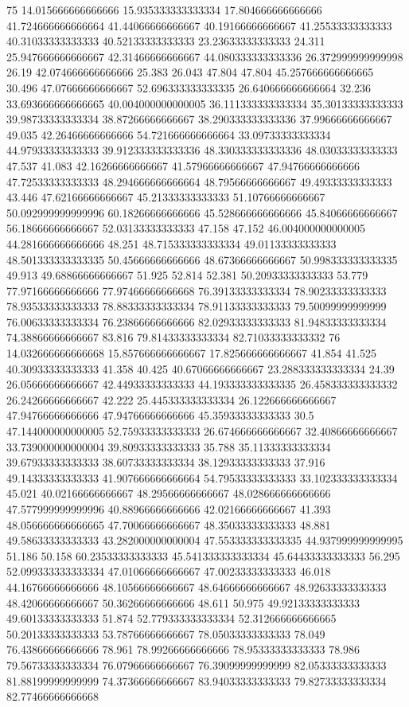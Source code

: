75 14.015666666666666 15.935333333333334 17.804666666666666 41.724666666666664 41.44066666666667 40.19166666666667 41.25533333333333 40.31033333333333 40.52133333333333 23.23633333333333 24.311 25.947666666666667 42.31466666666667 44.080333333333336 26.372999999999998 26.19 42.074666666666666 25.383 26.043 47.804 47.804 45.257666666666665 30.496 47.07666666666667 52.696333333333335 26.640666666666664 32.236 33.693666666666665 40.004000000000005 36.111333333333334 35.30133333333333 39.98733333333334 38.87266666666667 38.290333333333336 37.99666666666667 49.035 42.26466666666666 54.721666666666664 33.09733333333334 44.97933333333333 39.912333333333336 48.330333333333336 48.03033333333333 47.537 41.083 42.16266666666667 41.57966666666667 47.94766666666666 47.72533333333333 48.294666666666664 48.79566666666667 49.49333333333333 43.446 47.62166666666667 45.21333333333333 51.10766666666667 50.092999999999996 60.18266666666666 45.528666666666666 45.84066666666667 56.18666666666667 52.03133333333333 47.158 47.152 46.004000000000005 44.281666666666666 48.251 48.715333333333334 49.01133333333333 48.501333333333335 50.45666666666666 48.67366666666667 50.998333333333335 49.913 49.68866666666667 51.925 52.814 52.381 50.20933333333333 53.779 77.97166666666666 77.97466666666668 76.39133333333334 78.90233333333333 78.93533333333333 78.88333333333334 78.91133333333333 79.50099999999999 76.00633333333334 76.23866666666666 82.02933333333333 81.94833333333334 74.38866666666667 83.816 79.81433333333334 82.71033333333332
76 14.032666666666668 15.857666666666667 17.825666666666667 41.854 41.525 40.30933333333333 41.358 40.425 40.67066666666667 23.288333333333334 24.39 26.05666666666667 42.44933333333333 44.193333333333335 26.458333333333332 26.24266666666667 42.222 25.445333333333334 26.122666666666667 47.94766666666666 47.94766666666666 45.35933333333333 30.5 47.144000000000005 52.75933333333333 26.674666666666667 32.40866666666667 33.739000000000004 39.80933333333333 35.788 35.11333333333334 39.67933333333333 38.60733333333334 38.12933333333333 37.916 49.14333333333333 41.907666666666664 54.79533333333333 33.102333333333334 45.021 40.02166666666667 48.29566666666667 48.028666666666666 47.577999999999996 40.88966666666666 42.02166666666667 41.393 48.056666666666665 47.70066666666667 48.35033333333333 48.881 49.58633333333333 43.282000000000004 47.553333333333335 44.937999999999995 51.186 50.158 60.23533333333333 45.541333333333334 45.64433333333333 56.295 52.099333333333334 47.01066666666667 47.00233333333333 46.018 44.16766666666666 48.10566666666667 48.64666666666667 48.92633333333333 48.42066666666667 50.36266666666666 48.611 50.975 49.92133333333333 49.60133333333333 51.874 52.779333333333334 52.312666666666665 50.20133333333333 53.78766666666667 78.05033333333333 78.049 76.43866666666666 78.961 78.99266666666666 78.95333333333333 78.986 79.56733333333334 76.07966666666667 76.39099999999999 82.05333333333333 81.88199999999999 74.37366666666667 83.94033333333333 79.82733333333334 82.77466666666668

